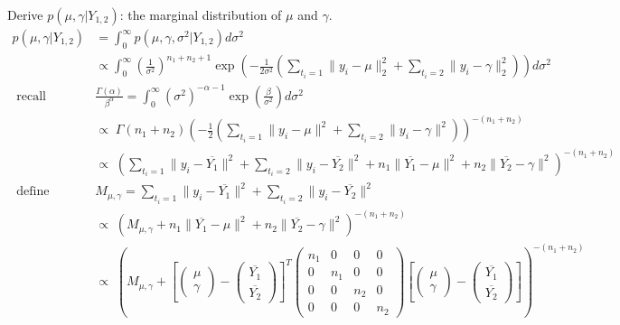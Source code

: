 \documentclass[12pt,letterpaper,twoside]{article}
\begin{document}
\begin{enumerate}[label=(\alph*)]
    Derive $p(\mu, \gamma|Y_{1,2})$: the marginal distribution of $\mu$ and $\gamma$.
    \begin{align*}
        p(\mu, \gamma|Y_{1,2}) & = \int_0^{\infty} p(\mu, \gamma, \sigma^2|Y_{1,2}) d\sigma^2 \\
            & \propto \int_0^{\infty} \left(\frac{1}{\sigma^2}\right)^{n_1+n_2+1} \exp\left(-\frac{1}{2\sigma^2}(\sum_{t_i=1} \|y_i-\mu\|^2_2 + \sum_{t_i=2} \|y_i-\gamma\|^2_2)\right) d\sigma^2 \\
        \textrm{ recall  }\quad& \frac{\Gamma(\alpha)}{\beta^\alpha} = \int_0^\infty (\sigma^2)^{-\alpha - 1} \exp\left(\frac{\beta}{\sigma^2}\right)d\sigma^2\\
            & \propto \; \Gamma(n_1 + n_2) \left(-\frac{1}{2} ( \sum_{t_i=1} \lVert y_i - \mu\rVert^2 + \sum_{t_i=2}\lVert y_i - \gamma \rVert^2)\right)^{-(n_1 + n_2)} \\
            & \propto \; (\sum_{t_i=1}\lVert y_i - \overline{Y_1} \rVert^2 + \sum_{t_i=2}\lVert y_i - \overline{Y_2} \rVert^2 + n_1\lVert \overline{Y_1} - \mu \rVert^2 + n_2\lVert \overline{Y_2} - \gamma \rVert^2)^{-(n_1 + n_2)}\\
        \textrm{ define  }\quad& M_{\mu, \gamma} = \sum_{t_i=1}\lVert y_i - \overline{Y_1} \rVert^2 + \sum_{t_i=2}\lVert y_i - \overline{Y_2} \rVert^2\\
            & \propto \; (M_{\mu, \gamma} + n_1\lVert \overline{Y_1} - \mu \rVert^2 + n_2\lVert \overline{Y_2} - \gamma \rVert^2)^{-(n_1 + n_2)}\\
            & \propto \; \left(M_{\mu, \gamma} + \left[\left(\begin{matrix}\mu\\ \gamma\end{matrix}\right) - \left(\begin{matrix*}\overline{Y_1}\\ \overline{Y_2}\end{matrix*}\right)\right]^T \left(\begin{matrix*} n_1 & 0 & 0 & 0 \\ 0 & n_1 & 0 & 0 \\ 0 & 0 & n_2 & 0 \\ 0 & 0 & 0 & n_2 \end{matrix*}\right) \left[\left(\begin{matrix}\mu\\ \gamma\end{matrix}\right) - \left(\begin{matrix*}\overline{Y_1}\\ \overline{Y_2}\end{matrix*}\right)\right]\right)^{-(n_1 + n_2)}\\

\end{align*}
\end{enumerate}
\end{document}
